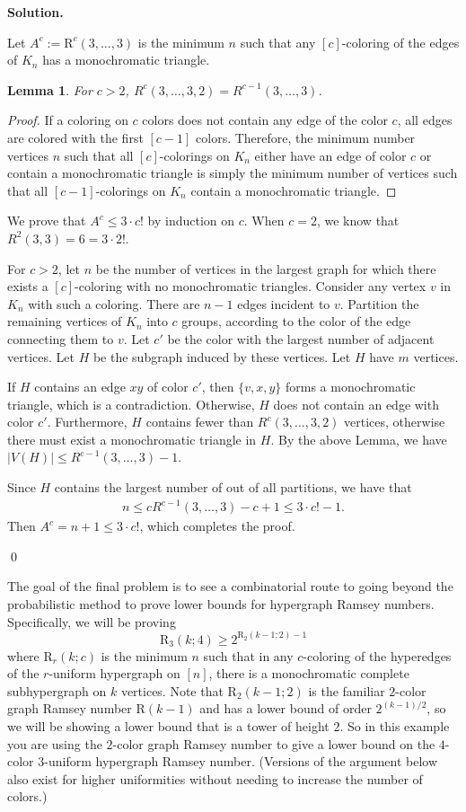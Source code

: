 \documentclass[11pt,letterpaper]{article}
\newtheorem{lemma}[theorem]{Lemma}
\theoremstyle{definition}
\newcommand{\solution}{\medskip\noindent\textbf{Solution.}\par\medskip}
\begin{document}
\solution
Let $A^c:=\mathrm{R}^c(3,\dots,3)$ is the minimum $n$ such that any $[c]$-coloring of the edges of $K_n$ has a monochromatic triangle.

\begin{lemma}
For $c>2$, $R^c(3,\dots,3, 2) = R^{c-1}(3,\dots,3)$.
\end{lemma}
\begin{proof}
    If a coloring on $c$ colors does not contain any edge of the color $c$, all edges are colored with the first $[c-1]$ colors.
    Therefore, the minimum number vertices $n$ such that all $[c]$-colorings on $K_n$ either have an edge of color $c$ or contain a monochromatic triangle is simply the minimum number of vertices such that all $[c-1]$-colorings on $K_n$ contain a monochromatic triangle.
\end{proof}

We prove that $A^c\leq 3 \cdot c!$ by induction on $c$.
When $c=2$, we know that $R^2(3,3) = 6 = 3\cdot 2!$.

For $c>2$, let $n$ be the number of vertices in the largest graph for which there exists a $[c]$-coloring with no monochromatic triangles.
Consider any vertex $v$ in $K_n$ with such a coloring. There are $n-1$ edges incident to $v$. 
Partition the remaining vertices of $K_n$ into $c$ groups, according to the color of the edge connecting them to $v$.
Let $c'$ be the color with the largest number of adjacent vertices.
Let $H$ be the subgraph induced by these vertices.
Let $H$ have $m$ vertices.

If $H$ contains an edge $xy$ of color $c'$, then $\{v,x,y\}$ forms a monochromatic triangle, which is a contradiction.
Otherwise, $H$ does not contain an edge with color $c'$. 
Furthermore, $H$ contains fewer than $R^c(3,\dots,3,2)$ vertices, otherwise there must exist a monochromatic triangle in $H$. 
By the above Lemma, we have $|V(H)|\leq R^{c-1}(3,\dots,3)-1$.

Since $H$ contains the largest number of out of all partitions, we have that 
\begin{align*}
    n \leq cR^{c-1}(3,\dots,3)-c+1 \leq 3\cdot c!-1.
\end{align*}
Then $A^c = n+1\leq 3\cdot c!$, which completes the proof.

\qed


The goal of the final problem is to see a combinatorial route to going beyond the probabilistic method to prove lower bounds for hypergraph Ramsey numbers. Specifically, we will be proving
\[
\mathrm{R}_3(k;4) \geq 2^{\mathrm{R}_2(k-1;2)-1}
\]
where $\mathrm{R}_r(k;c)$ is the minimum $n$ such that in any $c$-coloring of the hyperedges of the $r$-uniform hypergraph on $[n]$, there is a monochromatic complete subhypergraph on $k$ vertices. Note that $\mathrm{R}_2(k-1;2)$ is the familiar $2$-color graph Ramsey number $\mathrm{R}(k-1)$ and has a lower bound of order $2^{(k-1)/2}$, so we will be showing a lower bound that is a tower of height $2$. So in this example you are using the $2$-color graph Ramsey number to give a lower bound on the $4$-color $3$-uniform hypergraph Ramsey number. (Versions of the argument below also exist for higher uniformities without needing to increase the number of colors.)
\end{document}
